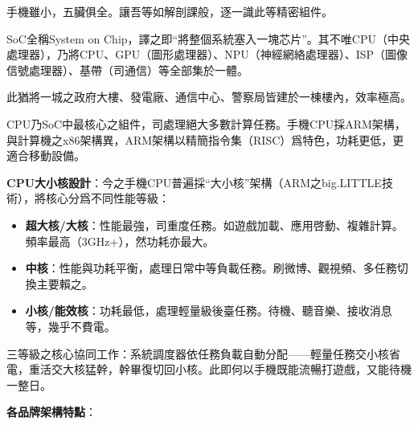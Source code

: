 


手機雖小，五臟俱全。讓吾等如解剖課般，逐一識此等精密組件。


SoC全稱System on Chip，譯之即“將整個系統塞入一塊芯片”。其不唯CPU（中央處理器），乃將CPU、GPU（圖形處理器）、NPU（神經網絡處理器）、ISP（圖像信號處理器）、基帶（司通信）等全部集於一體。

此猶將一城之政府大樓、發電廠、通信中心、警察局皆建於一棟樓內，效率極高。


CPU乃SoC中最核心之組件，司處理絕大多數計算任務。手機CPU採ARM架構，與計算機之x86架構異，ARM架構以精簡指令集（RISC）爲特色，功耗更低，更適合移動設備。

\textbf{CPU大小核設計}：今之手機CPU普遍採“大小核”架構（ARM之big.LITTLE技術），將核心分爲不同性能等級：

\begin{itemize}
  \item \textbf{超大核/大核}：性能最強，司重度任務。如遊戲加載、應用啓動、複雜計算。頻率最高（3GHz+），然功耗亦最大。
  \item \textbf{中核}：性能與功耗平衡，處理日常中等負載任務。刷微博、觀視頻、多任務切換主要賴之。
  \item \textbf{小核/能效核}：功耗最低，處理輕量級後臺任務。待機、聽音樂、接收消息等，幾乎不費電。
\end{itemize}

三等級之核心協同工作：系統調度器依任務負載自動分配——輕量任務交小核省電，重活交大核猛幹，幹畢復切回小核。此即何以手機既能流暢打遊戲，又能待機一整日。

\textbf{各品牌架構特點}：

